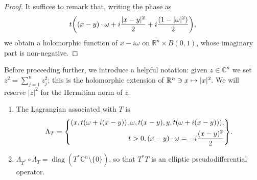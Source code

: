 \documentclass[10pt]{amsart}
\theoremstyle{definition}\newtheorem{defi}[theo]{Definition}\newtheorem{rema}[theo]{Remark}\newtheorem{exam}[theo]{Example}\newtheorem{exem}[theo]{Example}\newtheorem{nota}[theo]{Notation}
\DeclareMathOperator{\diag}{diag}
\newcommand\1{\mathds{1}}
\newcommand{\R}{\mathbb{R}}
\newcommand{\C}{\mathbb{C}}
\let\oldmapsto\mapsto
\renewcommand*{\mapsto}{\mathchoice{\longmapsto}{\oldmapsto}{\oldmapsto}{\oldmapsto}}
\let\originalleft\left
\let\originalright\right
\renewcommand{\left}{\mathopen{}\mathclose\bgroup\originalleft}
\renewcommand{\right}{\aftergroup\egroup\originalright}
\begin{document}
\begin{proof}
It suffices to remark that, writing the phase as
\[
t\left((x-y)\cdot \omega+i\frac{|x-y|^2}{2}+i\frac{(1-|\omega|^2)}{2}\right),
\]
we obtain a holomorphic function of $x-i\omega$ on $\R^n\times B(0,1)$, whose imaginary part is non-negative.
\end{proof}

Before proceeding further, we introduce a helpful notation: given $z\in \C^n$ we set $z^2=\sum_{j=1}^nz_j^2$; this is the holomorphic extension of $\R^n\ni x\mapsto |x|^2$. We will reserve $|z|^2$ for the Hermitian norm of $z$.

\begin{prop}\leavevmode
\label{prop:T*T}
\begin{enumerate}
\item\label{prop4.19.1} The Lagrangian associated with $T$ is
\[
\Lambda_T=
\left\{
\begin{aligned}
(x,t(\omega+i(x-y)),\omega,t(x-y),y,t(\omega+i(x-y))),\\
t>0,(x-y)\cdot \omega=-i\frac{(x-y)^2}{2}
\end{aligned}
\right\}.
\]
\item\label{prop4.19.2} $\Lambda_{T^*}\circ
\Lambda_T=\diag(T^*\C^n\setminus \{0\})$, so that $T^*T$ is an elliptic pseudodifferential operator.


\end{enumerate}
\end{prop}
\end{document}
